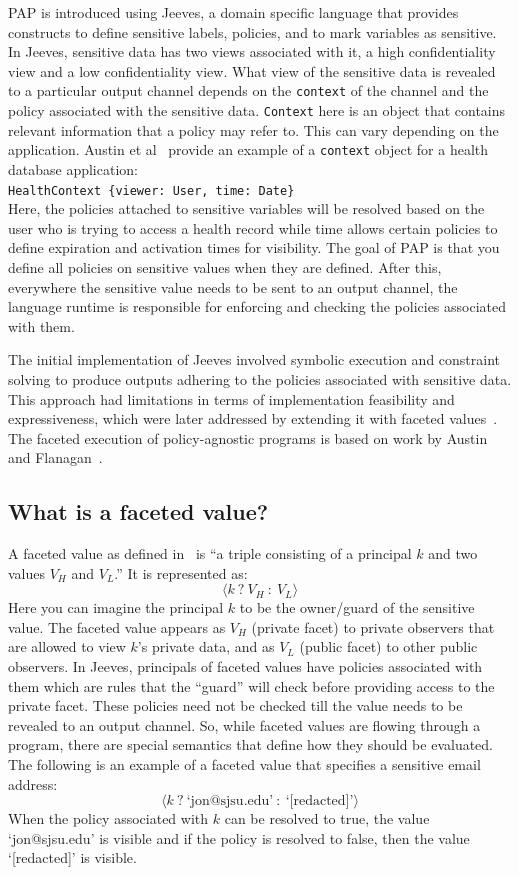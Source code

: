 PAP is introduced using Jeeves, a domain specific language that provides constructs
to define sensitive labels, policies, and to mark variables as sensitive. In
Jeeves, sensitive data has two views associated with it, a high confidentiality
view and a low confidentiality view. What view of the sensitive data is revealed
to a particular output channel depends on the \texttt{context} of the channel and the
policy associated with the sensitive data. \texttt{Context} here is an object that
contains relevant information that a policy may refer to. This can vary depending
on the application. Austin et al~\cite{FacetedJeeves} provide an example of a
\texttt{context} object for a health database application:\\
\indent \indent \texttt{HealthContext \{viewer: User, time: Date\}}\\
Here, the policies attached to sensitive variables will be resolved based on the
user who is trying to access a health record while time allows certain policies
to define expiration and activation times for visibility.
The goal of PAP is that you define all policies on sensitive values when they
are defined. After this, everywhere the sensitive value needs to be sent to an
output channel, the language runtime is responsible for enforcing and checking
the policies associated with them.

The initial implementation of Jeeves involved symbolic execution and constraint
solving to produce outputs adhering to the policies associated with sensitive data.
This approach had limitations in terms of implementation feasibility and expressiveness,
which were later addressed by extending it with faceted values~\cite{FacetedJeeves}.
The faceted execution of policy-agnostic programs is based on work by Austin and
Flanagan~\cite{Faceted}.

\subsection{What is a faceted value?}
A faceted value as defined in~\cite{Faceted} is ``a triple consisting of a principal
$k$ and two values $V_H$ and $V_L$.'' It is represented as:
\[\langle k~?~V_H~:~V_L \rangle\]
Here you can imagine the principal $k$ to be the owner/guard of the sensitive value.
The faceted value appears as $V_H$ (private facet) to private observers that are
allowed to view $k$'s private data, and as $V_L$ (public facet) to other public
observers. In Jeeves, principals of faceted values have policies associated with
them which are rules that the ``guard'' will check before providing access to the
private facet. These policies need not be checked till the value needs to be revealed
to an output channel. So, while faceted values are flowing through a program, there
are special semantics that define how they should be evaluated. The following is
an example of a faceted value that specifies a sensitive email address:
\[\langle k~?~\text{`jon@sjsu.edu'}~:~\text{`[redacted]'} \rangle\]
When the policy associated with $k$ can be resolved to true, the value `jon@sjsu.edu'
is visible and if the policy is resolved to false, then the value `[redacted]' is
visible.

